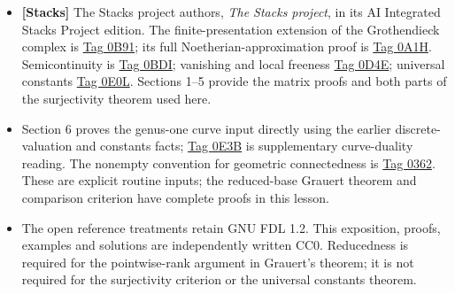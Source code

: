 \documentclass[11pt]{article}
\providecommand{\tightlist}{\setlength{\itemsep}{0pt}\setlength{\parskip}{0pt}}
\begin{document}
\begin{itemize}
\tightlist
\item
  \textbf{{[}Stacks{]}} The Stacks project authors, \emph{The Stacks
  project}, in its AI Integrated Stacks Project edition. The
  finite-presentation extension of the Grothendieck complex is
  \href{https://kokunoyumeto.github.io/stacks-zh-hans-cn/en/perfect.html\#perfect-lemma-flat-proper-perfect-direct-image-general}{Tag
  0B91}; its full Noetherian-approximation proof is
  \href{https://kokunoyumeto.github.io/stacks-zh-hans-cn/en/perfect.html\#perfect-lemma-base-change-tensor-perfect}{Tag
  0A1H}. Semicontinuity is
  \href{https://kokunoyumeto.github.io/stacks-zh-hans-cn/en/perfect.html\#perfect-lemma-jump-loci}{Tag
  0BDI}; vanishing and local freeness
  \href{https://kokunoyumeto.github.io/stacks-zh-hans-cn/en/perfect.html\#perfect-lemma-vanishing-implies-locally-free}{Tag
  0D4E}; universal constants
  \href{https://kokunoyumeto.github.io/stacks-zh-hans-cn/en/perfect.html\#perfect-lemma-proper-flat-geom-red-connected}{Tag
  0E0L}. Sections 1--5 provide the matrix proofs and both parts of the
  surjectivity theorem used here.
\item
  Section 6 proves the genus-one curve input directly using the earlier
  discrete-valuation and constants facts;
  \href{https://kokunoyumeto.github.io/stacks-zh-hans-cn/en/curves.html\#curves-lemma-degree-more-than-2g-2}{Tag
  0E3B} is supplementary curve-duality reading. The nonempty convention
  for geometric connectedness is
  \href{https://kokunoyumeto.github.io/stacks-zh-hans-cn/en/varieties.html\#varieties-definition-geometrically-connected}{Tag
  0362}. These are explicit routine inputs; the reduced-base Grauert
  theorem and comparison criterion have complete proofs in this lesson.
\item
  The open reference treatments retain GNU FDL 1.2. This exposition,
  proofs, examples and solutions are independently written CC0.
  Reducedness is required for the pointwise-rank argument in Grauert's
  theorem; it is not required for the surjectivity criterion or the
  universal constants theorem.
\end{itemize}
\end{document}
